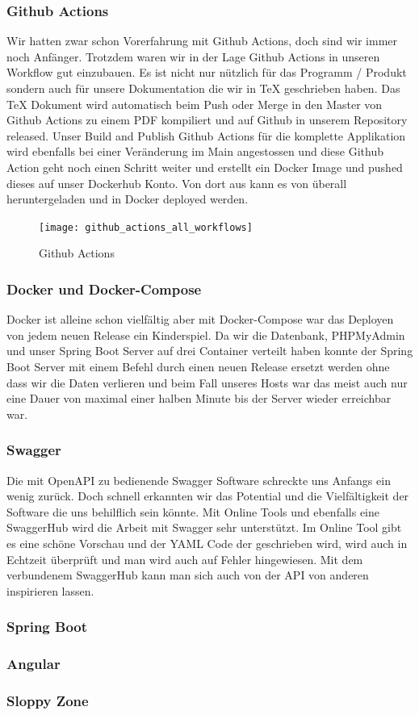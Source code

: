 \documentclass[../main.tex]{subfiles}
\begin{document}
	\subsubsection{Github Actions}
	Wir hatten zwar schon Vorerfahrung mit Github Actions, doch sind wir immer noch Anfänger. Trotzdem waren wir in der Lage Github Actions in unseren Workflow gut einzubauen. Es ist nicht nur nützlich für das Programm / Produkt sondern auch für unsere Dokumentation die wir in TeX geschrieben haben. Das TeX Dokument wird automatisch beim Push oder Merge in den Master von Github Actions zu einem PDF kompiliert und auf Github in unserem Repository released. Unser Build and Publish Github Actions für die komplette Applikation wird ebenfalls bei einer Veränderung im Main angestossen und diese Github Action geht noch einen Schritt weiter und erstellt ein Docker Image und pushed dieses auf unser Dockerhub Konto. Von dort aus kann es von überall heruntergeladen und in Docker deployed werden.
	\begin{figure}[H]
		\centering
		\texttt{[image: github\_actions\_all\_workflows]} 
		\caption{Github Actions}
		\label{fig:github_actions_all_workflows}
	\end{figure}
	
	\subsubsection{Docker und Docker-Compose}
	Docker ist alleine schon vielfältig aber mit Docker-Compose war das Deployen von jedem neuen Release ein Kinderspiel. Da wir die Datenbank, PHPMyAdmin und unser Spring Boot Server auf drei Container verteilt haben konnte der Spring Boot Server mit einem Befehl durch einen neuen Release ersetzt werden ohne dass wir die Daten verlieren und beim Fall unseres Hosts war das meist auch nur eine Dauer von maximal einer halben Minute bis der Server wieder erreichbar war.
	
	\subsubsection{Swagger}
	Die mit OpenAPI zu bedienende Swagger Software schreckte uns Anfangs ein wenig zurück. Doch schnell erkannten wir das Potential und die Vielfältigkeit der Software die uns behilflich sein könnte. Mit Online Tools und ebenfalls eine SwaggerHub wird die Arbeit mit Swagger sehr unterstützt. Im Online Tool gibt es eine schöne Vorschau und der YAML Code der geschrieben wird, wird auch in Echtzeit überprüft und man wird auch auf Fehler hingewiesen. Mit dem verbundenem SwaggerHub kann man sich auch von der API von anderen inspirieren lassen.
	
	\subsubsection{Spring Boot}
	
	\subsubsection{Angular}
	
	\subsubsection{Sloppy Zone}
	
\end{document}
